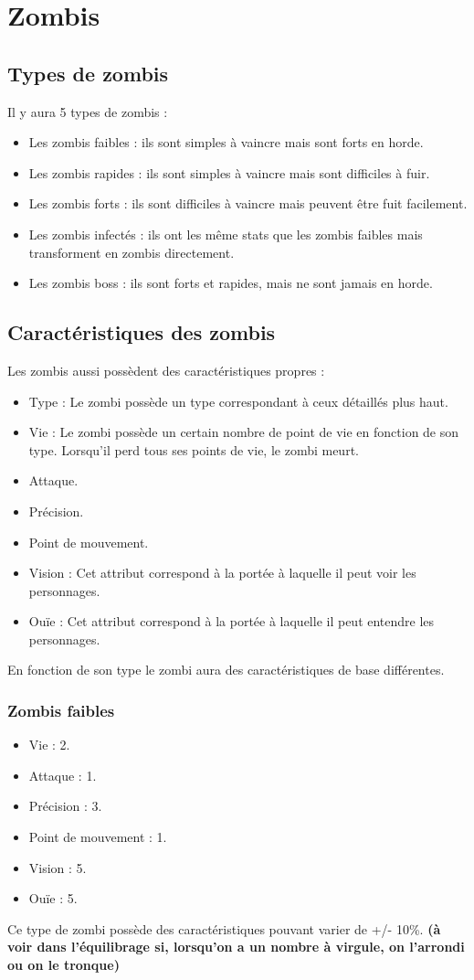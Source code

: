 \section{Zombis}
\subsection{Types de zombis}
Il y aura 5 types de zombis :
\begin{itemize}
  \item Les zombis faibles : ils sont simples à vaincre mais sont forts en horde.
  \item Les zombis rapides : ils sont simples à vaincre mais sont difficiles à fuir.
  \item Les zombis forts : ils sont difficiles à vaincre mais peuvent être fuit facilement.
  \item Les zombis infectés : ils ont les même stats que les zombis faibles mais transforment en zombis directement.
  \item Les zombis boss : ils sont forts et rapides, mais ne sont jamais en horde.
\end{itemize}
\subsection{Caractéristiques des zombis}
Les zombis aussi possèdent des caractéristiques propres :
\begin{itemize}
  \item Type : Le zombi possède un type correspondant à ceux détaillés plus haut.
  \item Vie : Le zombi possède un certain nombre de point de vie en fonction de son type. Lorsqu'il perd tous ses points de vie, le zombi meurt.
  \item Attaque.
  \item Précision.
  \item Point de mouvement.
  \item Vision : Cet attribut correspond à la portée à laquelle il peut voir les personnages.
  \item Ouïe : Cet attribut correspond à la portée à laquelle il peut entendre les personnages.
\end{itemize}
En fonction de son type le zombi aura des caractéristiques de base différentes.
\subsubsection{Zombis faibles}
\begin{itemize}
  \item Vie : 2.
  \item Attaque : 1.
  \item Précision : 3.
  \item Point de mouvement : 1.
  \item Vision : 5.
  \item Ouïe : 5.
\end{itemize}
Ce type de zombi possède des caractéristiques pouvant varier de +/- 10\%. \textbf{(à voir dans l'équilibrage si, lorsqu'on a un nombre à virgule, on l'arrondi ou on le tronque)}
